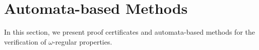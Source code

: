 \documentclass[acmlarge]{acmart}
\begin{document}

\section{Automata-based Methods}
\label{abm}
In this section, we present proof certificates and automata-based methods for the verification of $\omega$-regular properties. 


 
\end{document}
